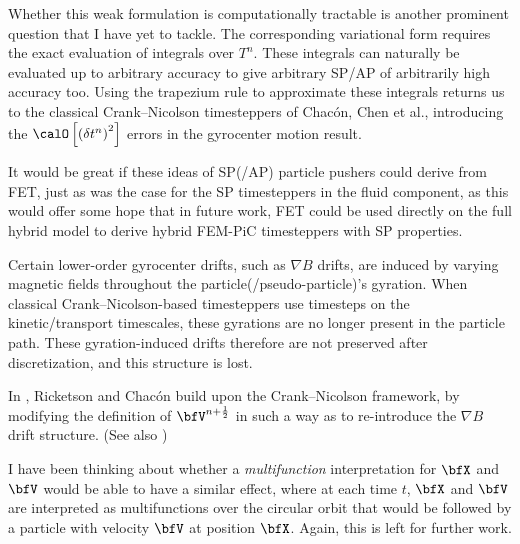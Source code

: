 \begin{remark}
        Whether this weak formulation is computationally tractable is another prominent question that I have yet to tackle. The corresponding variational form requires the exact evaluation of integrals over $T^{n}$. These integrals can naturally be evaluated up to arbitrary accuracy to give arbitrary SP/AP of arbitrarily high accuracy too. Using the trapezium rule to approximate these integrals returns us to the classical Crank--Nicolson timesteppers of Chacón, Chen et al., introducing the $\calO\left[\left(\delta t^{n}\right)^{2}\right]$ errors in the gyrocenter motion result.

        It would be great if these ideas of SP(/AP) particle pushers could derive from FET, just as was the case for the SP timesteppers in the fluid component, as this would offer some hope that in future work, FET could be used directly on the full hybrid model to derive hybrid FEM-PiC timesteppers with SP properties.
    \end{remark}

    \begin{remark}
        Certain lower-order gyrocenter drifts, such as $\nabla B$ drifts, are induced by varying magnetic fields throughout the particle(/pseudo-particle)'s gyration. When classical Crank--Nicolson-based timesteppers use timesteps on the kinetic/transport timescales, these gyrations are no longer present in the particle path. These gyration-induced drifts therefore are not preserved after discretization, and this structure is lost.
        
        In \cite{Ricketson_Chacón_2020}, Ricketson and Chacón build upon the Crank--Nicolson framework, by modifying the definition of $\bfV^{n + \frac{1}{2}}$ in such a way as to re-introduce the $\nabla B$ drift structure. (See also \cite{Koshkarov_et_al_2022})

        I have been thinking about whether a \emph{multifunction} interpretation for $\bfX$ and $\bfV$ would be able to have a similar effect, where at each time $t$, $\bfX$ and $\bfV$ are interpreted as multifunctions over the circular orbit that would be followed by a particle with velocity $\bfV$ at position $\bfX$. Again, this is left for further work.
    \end{remark}
